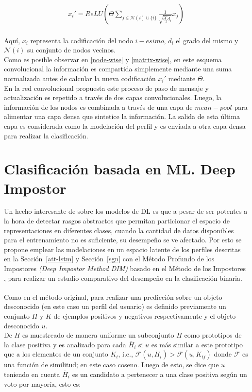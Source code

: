 	 \begin{align}\label{node-wise}
	 	x_i' = ReLU\left( \Theta \sum_{j \in \mathcal{N}(i) \cup \{i\}} \frac{1}{ 	\sqrt{ \hat{d_j} \hat{d_i} } }x_j \right)
	 \end{align}
	 \\
	 Aquí, $x_i$ representa la codificación del nodo $i-esimo$, $d_i$ el grado del mismo y $\mathcal{N}(i)$ su conjunto de nodos vecinos.
	 \\ 
	 Como es posible observar en \ref{node-wise} y \ref{matrix-wise}, en este esquema convolucional la información es compartida simplemente mediante una suma normalizada antes de calcular la nueva codificación $x_i'$ mediante $\Theta$.
	 \\
	 En la red convolucional propuesta este proceso de paso de mensaje y actualización es repetido a través de dos capas convolucionales. Luego, la información de los nodos es combinada a través de una capa de $mean-pool$ para alimentar una capa densa que sintetice la información. La salida de esta última capa es considerada como la modelación del perfil y es enviada a otra capa densa para realizar la clasificación.
	 
	 \section{Clasificación basada en ML. Deep Impostor }
	 
	 Un hecho interesante de sobre los modelos de DL es que a pesar de ser potentes a la hora de detectar rasgos abstractos que permitan particionar el espacio de representaciones en diferentes clases, cuando la cantidad de datos disponibles para el entrenamiento no es suficiente, su desempeño se ve afectado. Por esto se propone emplear las modelaciones  en un espacio latente de los perfiles descritas en la Sección~\ref{att-lstm} y Sección~\ref{sgn} con el Método Profundo de los Impostores \textit{(Deep Impostor Method DIM)} basado en el Método de los Impostores \citep{seidman2013authorship}, para realizar un estudio comparativo del desempeño en la clasificación binaria.
	 \\\\
	 Como en el método original, para realizar una predicción sobre un objeto desconocido (en este caso un perfil del usuario) es definido previamente un conjunto $H$ y $K$ de ejemplos positivos y negativos respectivamente y el objeto desconocido $u$.
	 \\
	 De $H$ es muestreado de manera uniforme un subconjunto $\bar{H}$ como prototipos de la clase positiva y es analizado para cada $\bar{H}_i$ si $u$ es más similar a este prototipo que a los elementos de un conjunto $\bar{K}_i$, i.e., $\mathcal{F}(u, \bar{H}_i) > \mathcal{F}(u, \bar{K}_{ij})$ donde $\mathcal{F}$ es una función de similitud; en este caso coseno. Luego de esto, se dice que $u$ teniendo en cuenta $\bar{H}_i$ es un candidato a pertenecer a una clase positiva según un voto por mayoría, esto es:
	 
